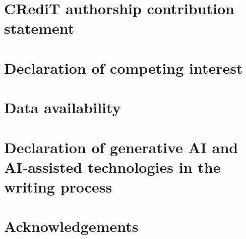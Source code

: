 \section*{CRediT authorship contribution statement}

\section*{Declaration of competing interest}

\section*{Data availability}

\section*{Declaration of generative AI and AI-assisted technologies in the writing process}

\section*{Acknowledgements}
